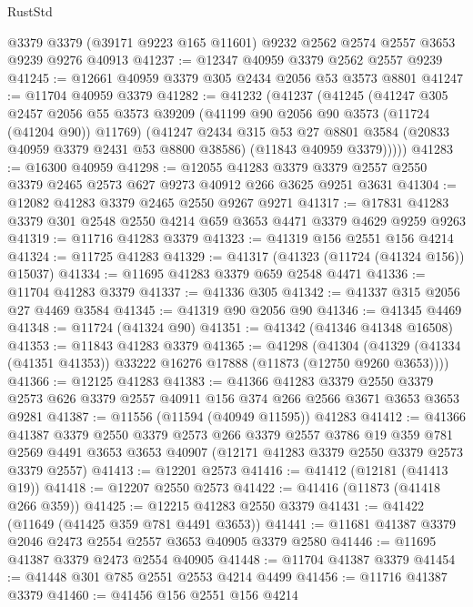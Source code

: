\begin{lexlean}{RustStd}
\begin{coremodule}
    @3379
    @3379
    (@39171 @9223 @165 @11601)
    @9232
    @2562
    @2574
    @2557
    @3653
    @9239
    @9276
    @40913
@41237 := @12347 @40959 @3379 @2562 @2557 @9239
@41245 := @12661 @40959 @3379 @305 @2434 @2056 @53 @3573 @8801
@41247 := @11704 @40959 @3379
@41282 := @41232
    (@41237
      (@41245
        (@41247
          @305
          @2457
          @2056
          @55
          @3573
          @39209
          (@41199 @90 @2056 @90 @3573 (@11724 (@41204 @90)) @11769)
          (@41247
            @2434
            @315
            @53
            @27
            @8801
            @3584
            (@20833 @40959 @3379 @2431 @53 @8800 @38586)
            (@11843 @40959 @3379)))))
@41283 := @16300 @40959
@41298 := @12055
    @41283
    @3379
    @3379
    @2557
    @2550
    @3379
    @2465
    @2573
    @627
    @9273
    @40912
    @266
    @3625
    @9251
    @3631
@41304 := @12082 @41283 @3379 @2465 @2550 @9267 @9271
@41317 := @17831 @41283 @3379 @301 @2548 @2550 @4214 @659 @3653 @4471 @3379 @4629 @9259 @9263
@41319 := @11716 @41283 @3379
@41323 := @41319 @156 @2551 @156 @4214
@41324 := @11725 @41283
@41329 := @41317 (@41323 (@11724 (@41324 @156)) @15037)
@41334 := @11695 @41283 @3379 @659 @2548 @4471
@41336 := @11704 @41283 @3379
@41337 := @41336 @305
@41342 := @41337 @315 @2056 @27 @4469 @3584
@41345 := @41319 @90 @2056 @90
@41346 := @41345 @4469
@41348 := @11724 (@41324 @90)
@41351 := @41342 (@41346 @41348 @16508)
@41353 := @11843 @41283 @3379
@41365 := @41298
    (@41304 (@41329 (@41334 (@41351 @41353)) @33222 @16276 @17888 (@11873 (@12750 @9260 @3653))))
@41366 := @12125 @41283
@41383 := @41366
    @41283
    @3379
    @2550
    @3379
    @2573
    @626
    @3379
    @2557
    @40911
    @156
    @374
    @266
    @2566
    @3671
    @3653
    @3653
    @9281
@41387 := @11556 (@11594 (@40949 @11595)) @41283
@41412 := @41366
    @41387
    @3379
    @2550
    @3379
    @2573
    @266
    @3379
    @2557
    @3786
    @19
    @359
    @781
    @2569
    @4491
    @3653
    @3653
    @40907
    (@12171 @41283 @3379 @2550 @3379 @2573 @3379 @2557)
@41413 := @12201 @2573
@41416 := @41412 (@12181 (@41413 @19))
@41418 := @12207 @2550 @2573
@41422 := @41416 (@11873 (@41418 @266 @359))
@41425 := @12215 @41283 @2550 @3379
@41431 := @41422 (@11649 (@41425 @359 @781 @4491 @3653))
@41441 := @11681 @41387 @3379 @2046 @2473 @2554 @2557 @3653 @40905 @3379 @2580
@41446 := @11695 @41387 @3379 @2473 @2554 @40905
@41448 := @11704 @41387 @3379
@41454 := @41448 @301 @785 @2551 @2553 @4214 @4499
@41456 := @11716 @41387 @3379
@41460 := @41456 @156 @2551 @156 @4214

\end{coremodule}
\end{lexlean}

